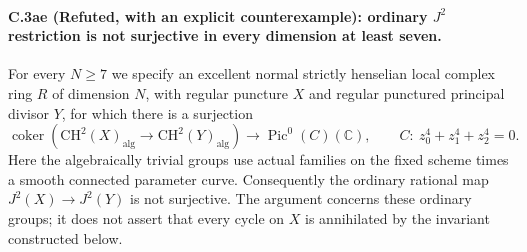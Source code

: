 \paragraph{C.3ae (Refuted, with an explicit counterexample): ordinary $J^2$ restriction is not surjective in every dimension at least seven.}
For every $N\ge7$ we specify an excellent normal strictly
henselian local complex ring $R$ of dimension $N$, with
regular puncture $X$ and regular punctured principal divisor
$Y$, for which there is a surjection
\begin{equation}\label{eq:C3ae-cokernel}
 \operatorname{coker}\!\left(
 \mathrm{CH}^2(X)_{\mathrm{alg}}
       \longrightarrow\mathrm{CH}^2(Y)_{\mathrm{alg}}\right)
       \longrightarrow \operatorname{Pic}^0(C)(\mathbb C),
 \qquad C:\ z_0^4+z_1^4+z_2^4=0.
\end{equation}
Here the algebraically trivial groups use actual families on
the fixed scheme times a smooth connected parameter curve.
Consequently the ordinary rational map $J^2(X)\to J^2(Y)$
is not surjective. The argument concerns these ordinary
groups; it does not assert that every cycle on $X$ is
annihilated by the invariant constructed below.

